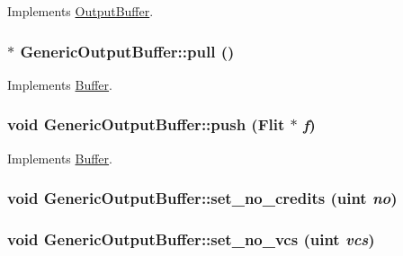Implements \hyperlink{classOutputBuffer_7cba09e2dbb3794d873862b5066fd085}{OutputBuffer}.\hypertarget{classGenericOutputBuffer_3c3f1b425635f59b0539805945ddb1bd}{
\subsubsection[{pull}]{ $\ast$ GenericOutputBuffer::pull ()}}
\label{classGenericOutputBuffer_3c3f1b425635f59b0539805945ddb1bd}




Implements \hyperlink{classBuffer_95f5c230f9c261bc13ddcfafcc340e7e}{Buffer}.\hypertarget{classGenericOutputBuffer_f2b4047e054df5bb9b624ce0b0bbf0e2}{
\subsubsection[{push}]{\setlength{\rightskip}{0pt plus 5cm}void GenericOutputBuffer::push ({\bf Flit} $\ast$ {\em f})}}
\label{classGenericOutputBuffer_f2b4047e054df5bb9b624ce0b0bbf0e2}




Implements \hyperlink{classBuffer_c9dce1860c655146f000df30314caaa9}{Buffer}.\hypertarget{classGenericOutputBuffer_632ffda3db2c9729e2d9d6d1645defb3}{
\subsubsection[{set\_\-no\_\-credits}]{\setlength{\rightskip}{0pt plus 5cm}void GenericOutputBuffer::set\_\-no\_\-credits ({\bf uint} {\em no})}}
\label{classGenericOutputBuffer_632ffda3db2c9729e2d9d6d1645defb3}


\hypertarget{classGenericOutputBuffer_a0dcb541c9d64d097a21dd8b290c3950}{
\subsubsection[{set\_\-no\_\-vcs}]{\setlength{\rightskip}{0pt plus 5cm}void GenericOutputBuffer::set\_\-no\_\-vcs ({\bf uint} {\em vcs})}}
\label{classGenericOutputBuffer_a0dcb541c9d64d097a21dd8b290c3950}


